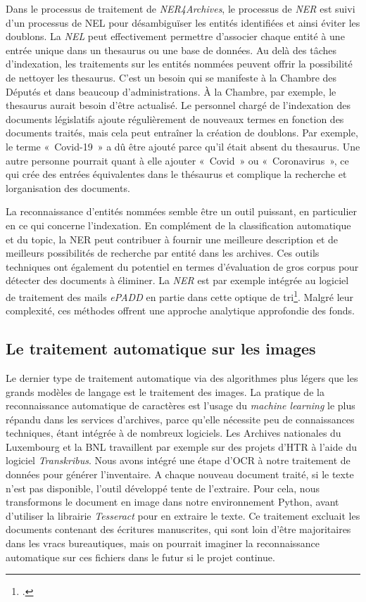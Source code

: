 Dans le processus de traitement de
\emph{NER4Archives}, le processus de \emph{NER} est suivi d'un processus de \gls{NEL}
 pour désambiguïser les entités identifiées et
ainsi éviter les doublons. La \emph{NEL} peut effectivement permettre
d'associer chaque entité à une entrée unique dans un thesaurus ou une
base de données. Au delà des tâches d'indexation, les traitements sur
les entités nommées peuvent offrir la possibilité de nettoyer les
thesaurus. C'est un besoin qui se manifeste à la Chambre des Députés et
dans beaucoup d'administrations. À la Chambre, par exemple, le thesaurus
aurait besoin d'être actualisé. Le personnel chargé de l'indexation des
documents législatifs ajoute régulièrement de nouveaux termes en
fonction des documents traités, mais cela peut entraîner la création de
doublons. Par exemple, le terme «~Covid-19~» a dû être ajouté parce
qu'il était absent du thesaurus. Une autre personne pourrait quant à
elle ajouter «~Covid~» ou «~Coronavirus~», ce qui crée des entrées
équivalentes dans le thésaurus et complique la recherche et
l\textquotesingle organisation des documents.

La reconnaissance d'entités nommées semble être un outil puissant, en
particulier en ce qui concerne l'indexation. En complément de la
classification automatique et du \gls{topic}, la \gls{NER} peut
contribuer à fournir une meilleure description et de meilleurs possibilités
de recherche par entité dans les archives. Ces outils techniques ont
également du potentiel en termes d'évaluation de gros corpus pour
détecter des documents à éliminer. La \emph{NER} est par exemple intégrée au
logiciel de traitement des mails \emph{ePADD} en partie dans cette optique de
tri\footcite{lee_computer-assisted_2018}. Malgré leur
complexité, ces méthodes
offrent une approche analytique approfondie des fonds.

\subsection{Le traitement automatique sur les images}

Le dernier type de traitement automatique via des algorithmes plus
légers que les grands modèles de langage est le traitement des images.
La pratique de la reconnaissance automatique de caractères est l'usage
du \emph{machine learning} le plus répandu dans les services d'archives, parce
qu'elle nécessite peu de connaissances techniques, étant intégrée à de
nombreux logiciels. Les Archives nationales du Luxembourg et la BNL travaillent par exemple
sur des projets d'\gls{HTR} à l'aide du logiciel \emph{Transkribus}.
Nous avons intégré une étape d'\gls{OCR} à notre traitement de données pour générer l'inventaire.
A chaque nouveau document traité, si le texte n'est pas disponible, l'outil développé tente de l'extraire.
Pour cela, nous transformons le document en image dans notre environnement Python, avant d'utiliser la
librairie \emph{Tesseract} pour en extraire le texte. Ce traitement excluait les documents contenant des écritures manuscrites, 
qui sont loin d'être majoritaires dans les vracs bureautiques, mais on pourrait imaginer la reconnaissance automatique sur ces fichiers dans le futur
si le projet continue.

